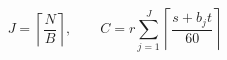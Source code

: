 \documentclass{article}
\begin{document}
\[J=\left\lceil\frac{N}{B}\right\rceil,\qquad C=r\sum_{j=1}^{J}\left\lceil\frac{s+b_jt}{60}\right\rceil\]
\end{document}
